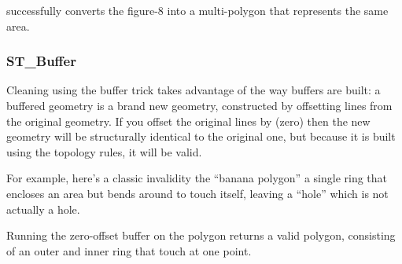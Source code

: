 \documentclass[a4paper,11pt,english]{sphinxmanual}
\begin{document}
 successfully converts the figure-8 into a multi-polygon that represents the same area.


\subsubsection{ST\_Buffer}
\label{\detokenize{advanced:st-buffer}}
Cleaning using the buffer trick takes advantage of the way buffers are built: a buffered geometry is a brand new geometry, constructed by offsetting lines from the original geometry. If you offset the original lines by  (zero) then the new geometry will be structurally identical to the original one, but because it is built using the {\hyperref[\detokenize{glossary:term-ogc}]{}} topology rules, it will be valid.

For example, here’s a classic invalidity \textendash{} the “banana polygon” \textendash{} a single ring that encloses an area but bends around to touch itself, leaving a “hole” which is not actually a hole.

\begin{sphinxVerbatim}[commandchars=\\\{\}]
                   
\end{sphinxVerbatim}

\noindent{}

Running the zero-offset buffer on the polygon returns a valid {\hyperref[\detokenize{glossary:term-ogc}]{}} polygon, consisting of an outer and inner ring that touch at one point.

\begin{sphinxVerbatim}[commandchars=\\\{\}]
 
\end{sphinxVerbatim}
\end{document}

